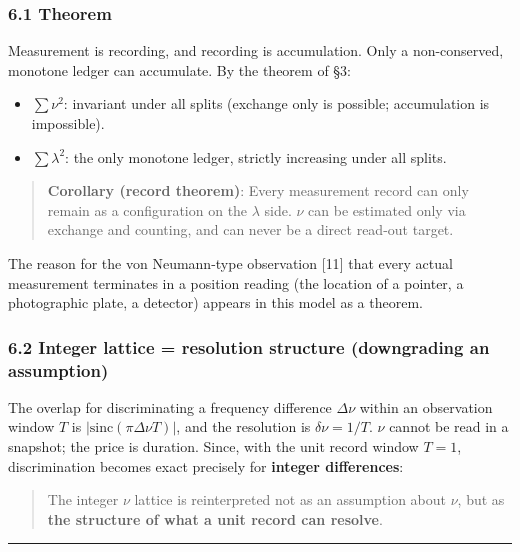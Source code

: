 \documentclass[
]{article}
\providecommand{\tightlist}{%
  \setlength{\itemsep}{0pt}\setlength{\parskip}{0pt}}
\begin{document}
\subsubsection{6.1 Theorem}\label{theorem}

Measurement is recording, and recording is accumulation. Only a
non-conserved, monotone ledger can accumulate. By the theorem of §3:

\begin{itemize}
\tightlist
\item
  \(\sum\nu^2\): invariant under all splits (exchange only is possible;
  accumulation is impossible).
\item
  \(\sum\lambda^2\): the only monotone ledger, strictly increasing under
  all splits.
\end{itemize}

\begin{quote}
\textbf{Corollary (record theorem)}: Every measurement record can only
remain as a configuration on the \(\lambda\) side. \(\nu\) can be
estimated only via exchange and counting, and can never be a direct
read-out target.
\end{quote}

The reason for the von Neumann-type observation {[}11{]} that every
actual measurement terminates in a position reading (the location of a
pointer, a photographic plate, a detector) appears in this model as a
theorem.

\subsubsection{6.2 Integer lattice = resolution structure (downgrading
an
assumption)}\label{integer-lattice-resolution-structure-downgrading-an-assumption}

The overlap for discriminating a frequency difference \(\Delta\nu\)
within an observation window \(T\) is
\(|\mathrm{sinc}(\pi\Delta\nu T)|\), and the resolution is
\(\delta\nu=1/T\). \(\nu\) cannot be read in a snapshot; the price is
duration. Since, with the unit record window \(T=1\), discrimination
becomes exact precisely for \textbf{integer differences}:

\begin{quote}
The integer \(\nu\) lattice is reinterpreted not as an assumption about
\(\nu\), but as \textbf{the structure of what a unit record can
resolve}.
\end{quote}

\begin{center}\rule{0.5\linewidth}{0.5pt}\end{center}
\end{document}
